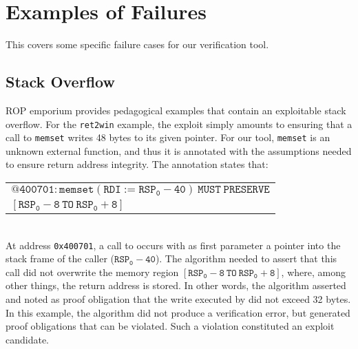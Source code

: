 \section{Examples of Failures}\label{sec:not-me-failures}
This  covers some specific failure cases for our verification tool.

\subsection{Stack Overflow}
ROP emporium provides pedagogical examples that contain an exploitable stack overflow.
For the \texttt{ret2win} example, the exploit simply amounts to ensuring that a call to \texttt{memset} writes 48 bytes to its given pointer.
For our tool, \texttt{memset} is an unknown external function, and thus it is annotated with the assumptions needed to ensure return address integrity.
The annotation states that:
\\[1ex]
\begin{tabular}{l}
  $\mathtt{@400701: memset(RDI:=RSP_0 - 40)~MUST~PRESERVE }$\\
  \hspace{32ex}$\mathtt{ [ RSP_0 - 8~TO~RSP_0 + 8 ]}$
\end{tabular}
\\[1ex]
At address \texttt{0x400701}, a call to  occurs with as first parameter a pointer into the stack frame of the caller ($\mathtt{RSP_0 - 40}$).
The algorithm needed to assert that this call did not overwrite the memory region $\mathtt{[ RSP_0 - 8 ~TO~ RSP_0 + 8 ]}$, where, among other things, the return address is stored.
In other words, the algorithm asserted and noted as proof obligation that the write executed by  did not exceed 32 bytes.
In this example, the algorithm did not produce a verification error, but generated proof obligations that can be violated. Such a violation constituted an exploit candidate.


